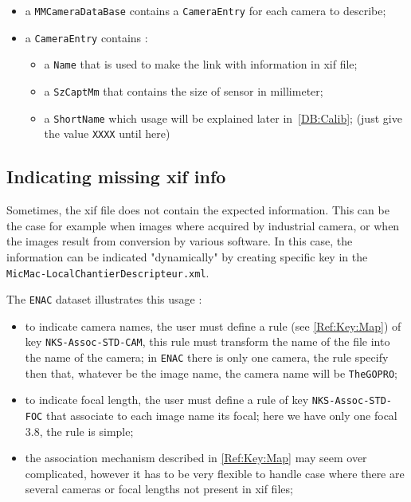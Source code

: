 \begin{itemize}
    \item a {\tt MMCameraDataBase} contains  a {\tt CameraEntry} for each  camera
          to describe;
    \item a {\tt CameraEntry} contains :


     \begin{itemize}
           \item a {\tt Name} that is used to make the link with information in xif file;
           \item a {\tt SzCaptMm} that contains the size of sensor in millimeter;
           \item a {\tt ShortName} which usage will be explained later  in~\ref{DB:Calib};
                (just give the value {\tt XXXX} until here)
     \end{itemize}
\end{itemize}


\subsection{Indicating missing xif info}

Sometimes, the xif file does not contain the expected information. This can be the
case for example when images where acquired by industrial camera, or when the images
result from conversion by various software. In this case, the information can be indicated "dynamically"
by creating specific key in the {\tt  MicMac-LocalChantierDescripteur.xml}.

The {\tt ENAC} dataset illustrates this usage :

\begin{itemize}
    \item to indicate camera names, the user must define a rule
           (see \ref{Ref:Key:Map}) of key  {\tt NKS-Assoc-STD-CAM}, this rule must
           transform the name of the file into the name of the camera;
           in {\tt ENAC} there is only one camera, the rule specify  then that,
           whatever be the image name, the camera name will be {\tt TheGOPRO};


    \item to indicate focal length, the user must define a rule
          of key {\tt NKS-Assoc-STD-FOC} that associate to each image name
          its focal; here we have only one focal $3.8$, the rule is simple;


    \item the association mechanism described in \ref{Ref:Key:Map} may seem
          over complicated, however it has to be very flexible to handle case
          where there are several cameras or focal lengths not present in xif files;

\end{itemize}


